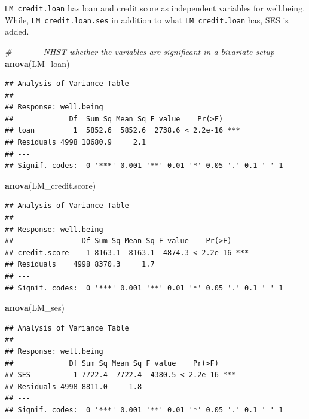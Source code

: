 \documentclass[]{article}
\newenvironment{Shaded}{\begin{snugshade}}{\end{snugshade}}
\newcommand{\CommentTok}[1]{\textcolor[rgb]{0.56,0.35,0.01}{\textit{#1}}}
\newcommand{\KeywordTok}[1]{\textcolor[rgb]{0.13,0.29,0.53}{\textbf{#1}}}
\newcommand{\NormalTok}[1]{#1}
\begin{document}
\texttt{LM\_credit.loan} has loan and credit.score as independent
variables for well.being. While, \texttt{LM\_credit.loan.ses} in
addition to what \texttt{LM\_credit.loan} has, SES is added.

\begin{Shaded}
\begin{Highlighting}[]
\CommentTok{# --------- NHST whether the variables are significant in a bivariate setup}
\KeywordTok{anova}\NormalTok{(LM_loan) }
\end{Highlighting}
\end{Shaded}

\begin{verbatim}
## Analysis of Variance Table
## 
## Response: well.being
##             Df  Sum Sq Mean Sq F value    Pr(>F)    
## loan         1  5852.6  5852.6  2738.6 < 2.2e-16 ***
## Residuals 4998 10680.9     2.1                      
## ---
## Signif. codes:  0 '***' 0.001 '**' 0.01 '*' 0.05 '.' 0.1 ' ' 1
\end{verbatim}

\begin{Shaded}
\begin{Highlighting}[]
\KeywordTok{anova}\NormalTok{(LM_credit.score)}
\end{Highlighting}
\end{Shaded}

\begin{verbatim}
## Analysis of Variance Table
## 
## Response: well.being
##                Df Sum Sq Mean Sq F value    Pr(>F)    
## credit.score    1 8163.1  8163.1  4874.3 < 2.2e-16 ***
## Residuals    4998 8370.3     1.7                      
## ---
## Signif. codes:  0 '***' 0.001 '**' 0.01 '*' 0.05 '.' 0.1 ' ' 1
\end{verbatim}

\begin{Shaded}
\begin{Highlighting}[]
\KeywordTok{anova}\NormalTok{(LM_ses)}
\end{Highlighting}
\end{Shaded}

\begin{verbatim}
## Analysis of Variance Table
## 
## Response: well.being
##             Df Sum Sq Mean Sq F value    Pr(>F)    
## SES          1 7722.4  7722.4  4380.5 < 2.2e-16 ***
## Residuals 4998 8811.0     1.8                      
## ---
## Signif. codes:  0 '***' 0.001 '**' 0.01 '*' 0.05 '.' 0.1 ' ' 1
\end{verbatim}
\end{document}
